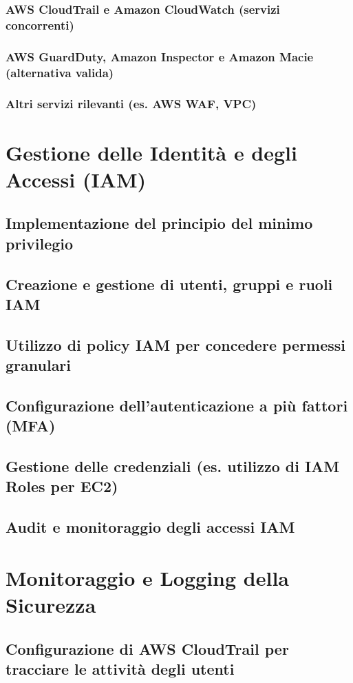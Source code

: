 \documentclass[a4paper,12pt]{report}
\begin{document}
\subsection{AWS CloudTrail e Amazon CloudWatch (servizi concorrenti)}
\subsection{AWS GuardDuty, Amazon Inspector e Amazon Macie (alternativa valida)}
\subsection{Altri servizi rilevanti (es. AWS WAF, VPC)}

\chapter{Gestione delle Identità e degli Accessi (IAM)}
\section{Implementazione del principio del minimo privilegio}
\section{Creazione e gestione di utenti, gruppi e ruoli IAM}
\section{Utilizzo di policy IAM per concedere permessi granulari}
\section{Configurazione dell'autenticazione a più fattori (MFA)}
\section{Gestione delle credenziali (es. utilizzo di IAM Roles per EC2)}
\section{Audit e monitoraggio degli accessi IAM}

\chapter{Monitoraggio e Logging della Sicurezza}
\section{Configurazione di AWS CloudTrail per tracciare le attività degli utenti}
\end{document}
